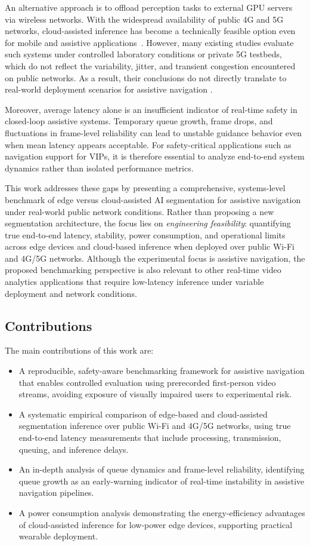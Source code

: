 \documentclass{ieeeaccess}
\begin{document}
An alternative approach is to offload perception tasks to external GPU servers via wireless networks. With the widespread availability of public 4G and 5G networks, cloud-assisted inference has become a technically feasible option even for mobile and assistive applications~\cite{black2024teleoperation}. However, many existing studies evaluate such systems under controlled laboratory conditions or private 5G testbeds, which do not reflect the variability, jitter, and transient congestion encountered on public networks. As a result, their conclusions do not directly translate to real-world deployment scenarios for assistive navigation \cite{sah2025comprehensive}.

Moreover, average latency alone is an insufficient indicator of real-time safety in closed-loop assistive systems. Temporary queue growth, frame drops, and fluctuations in frame-level reliability can lead to unstable guidance behavior even when mean latency appears acceptable. For safety-critical applications such as navigation support for VIPs, it is therefore essential to analyze end-to-end system dynamics rather than isolated performance metrics.

This work addresses these gaps by presenting a comprehensive, systems-level benchmark of edge versus cloud-assisted AI segmentation for assistive navigation under real-world public network conditions. Rather than proposing a new segmentation architecture, the focus lies on \emph{engineering feasibility}: quantifying true end-to-end latency, stability, power consumption, and operational limits across edge devices and cloud-based inference when deployed over public Wi-Fi and 4G/5G networks. Although the experimental focus is assistive navigation, the proposed benchmarking perspective is also relevant to other real-time video analytics applications that require low-latency inference under variable deployment and network conditions.


\subsection{Contributions}
The main contributions of this work are:
\begin{itemize}
\item A reproducible, safety-aware benchmarking framework for assistive navigation that enables controlled evaluation using prerecorded first-person video streams, avoiding exposure of visually impaired users to experimental risk.
\item  A systematic empirical comparison of edge-based and cloud-assisted segmentation inference over public Wi-Fi and 4G/5G networks, using true end-to-end latency measurements that include processing, transmission, queuing, and inference delays.
\item  An in-depth analysis of queue dynamics and frame-level reliability, identifying queue growth as an early-warning indicator of real-time instability in assistive navigation pipelines.
\item  A power consumption analysis demonstrating the energy-efficiency advantages of cloud-assisted inference for low-power edge devices, supporting practical wearable deployment.
\end{itemize}
\end{document}
